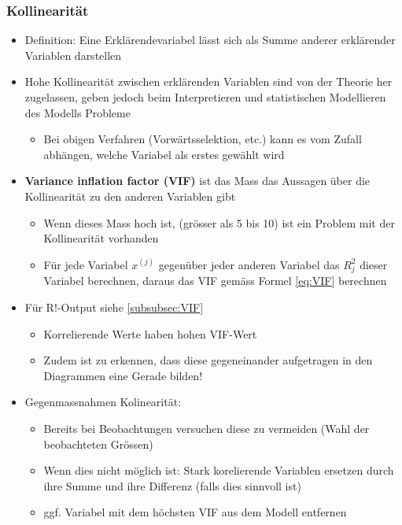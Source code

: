 \subsubsection{Kollinearität}
\begin{itemize}
	\item Definition: Eine Erklärendevariabel lässt sich als Summe anderer erklärender Variablen darstellen
	\item Hohe Kollinearität zwischen erklärenden Variablen sind von der Theorie her zugelassen, geben jedoch beim Interpretieren und statistischen Modellieren des Modells Probleme
	\begin{itemize}
		\item Bei obigen Verfahren (Vorwärtsselektion, etc.) kann es vom Zufall abhängen, welche Variabel als erstes gewählt wird
	\end{itemize}
	\item \textbf{Variance inflation factor (VIF)} ist das Mass das Aussagen über die Kollinearität zu den anderen Variablen gibt
	\begin{itemize}
		\item Wenn dieses Mass hoch ist, (grösser als 5 bis 10) ist ein Problem mit der Kollinearität vorhanden
		\item Für jede Variabel $x^{(j)}$ gegenüber jeder anderen Variabel das $R_j^2$ dieser Variabel berechnen, daraus das VIF gemäss Formel \ref{eq:VIF} berechnen
	\end{itemize}
	\item Für R!-Output siehe \ref{subsubsec:VIF}
	\begin{itemize}
		\item Korrelierende Werte haben hohen VIF-Wert
		\item Zudem ist zu  erkennen, dass diese gegeneinander aufgetragen in den Diagrammen eine Gerade bilden!
	\end{itemize}
	\item Gegenmassnahmen Kolinearität:
	\begin{itemize}
		\item Bereits bei Beobachtungen versuchen diese zu vermeiden (Wahl der beobachteten Grössen)
		\item Wenn dies nicht möglich ist: Stark korelierende Variablen ersetzen durch ihre Summe und ihre Differenz (falls dies sinnvoll ist)
		\item ggf. Variabel mit dem höchsten VIF aus dem Modell entfernen
	\end{itemize}
\end{itemize}

